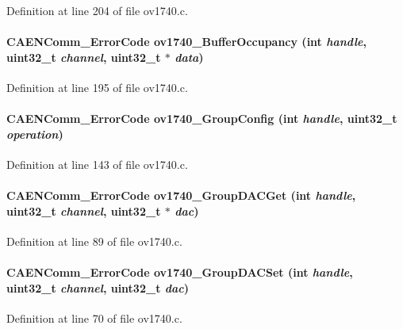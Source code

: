 Definition at line 204 of file ov1740.c.
\paragraph[{ov1740\_\-BufferOccupancy}]{\setlength{\rightskip}{0pt plus 5cm}CAENComm\_\-ErrorCode ov1740\_\-BufferOccupancy (int {\em handle}, \/  uint32\_\-t {\em channel}, \/  uint32\_\-t $\ast$ {\em data})}\hfill\label{ov1740_8c_a4b3f7a80a817dfdcaf612ebb946f7844}


Definition at line 195 of file ov1740.c.
\paragraph[{ov1740\_\-GroupConfig}]{\setlength{\rightskip}{0pt plus 5cm}CAENComm\_\-ErrorCode ov1740\_\-GroupConfig (int {\em handle}, \/  uint32\_\-t {\em operation})}\hfill\label{ov1740_8c_aba13dbef693106001aa52528e3ee33cd}


Definition at line 143 of file ov1740.c.
\paragraph[{ov1740\_\-GroupDACGet}]{\setlength{\rightskip}{0pt plus 5cm}CAENComm\_\-ErrorCode ov1740\_\-GroupDACGet (int {\em handle}, \/  uint32\_\-t {\em channel}, \/  uint32\_\-t $\ast$ {\em dac})}\hfill\label{ov1740_8c_a72d507dc22b139983064f68ec4154aae}


Definition at line 89 of file ov1740.c.
\paragraph[{ov1740\_\-GroupDACSet}]{\setlength{\rightskip}{0pt plus 5cm}CAENComm\_\-ErrorCode ov1740\_\-GroupDACSet (int {\em handle}, \/  uint32\_\-t {\em channel}, \/  uint32\_\-t {\em dac})}\hfill\label{ov1740_8c_a8d990b4f92dc4c11d27f7681f53b8098}


Definition at line 70 of file ov1740.c.
